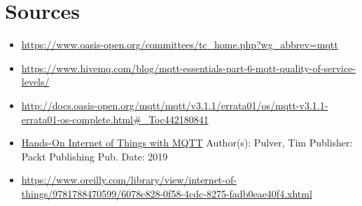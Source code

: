 \documentclass[a4paper,10pt]{article}
\begin{document}
 \section{Sources}

\begin{itemize}
 \item \url{https://www.oasis-open.org/committees/tc_home.php?wg_abbrev=mqtt}
 \item \url{https://www.hivemq.com/blog/mqtt-essentials-part-6-mqtt-quality-of-service-levels/}
 \item \url{http://docs.oasis-open.org/mqtt/mqtt/v3.1.1/errata01/os/mqtt-v3.1.1-errata01-os-complete.html#_Toc442180841}
 \item \underline{Hands-On Internet of Things with MQTT} Author(s): Pulver, Tim Publisher: Packt Publishing Pub. Date: 2019
 \item \url{https://www.oreilly.com/library/view/internet-of-things/9781788470599/6078c828-0f58-4cdc-8275-fadb0eae40f4.xhtml}
\end{itemize}
\end{document}
